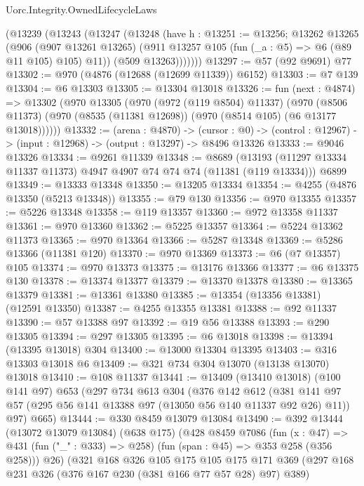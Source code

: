 \begin{lexlean}{Uorc.Integrity.OwnedLifecycleLaws}
\begin{coremodule}
      (@13239
        (@13243
          (@13247
            (@13248
              (have h : @13251 := @13256;
              @13262
                @13265
                (@906
                  (@907 @13261 @13265)
                  (@911 @13257 @105 (fun (_a : @5) => @6 (@89 @11 @105) @105) @11))
                (@509 @13263)))))))
@13297 := @57 (@92 @9691) @77
@13302 := @970 (@4876 (@12688 (@12699 @11339)) @6152)
@13303 := @7 @139
@13304 := @6 @13303
@13305 := @13304 @13018
@13326 := fun (next : @4874) =>
  @13302
    (@970
      @13305
      (@970
        (@972 (@119 @8504) @11337)
        (@970
          (@8506 @11373)
          (@970 (@8535 (@11381 @12698)) (@970 (@8514 @105) (@6 @13177 @13018))))))
@13332 := (arena : @4870) ->
  (cursor : @0) -> (control : @12967) -> (input : @12968) -> (output : @13297) -> @8496 @13326
@13333 := @9046 @13326
@13334 := @9261 @11339
@13348 := @8689
    (@13193 (@11297 @13334 @11337 @11373) @4947 @4907 @74 @74 @74 (@11381 (@119 @13334)))
    @6899
@13349 := @13333 @13348
@13350 := @13205 @13334
@13354 := @4255 (@4876 @13350 (@5213 @13348))
@13355 := @79 @130
@13356 := @970 @13355
@13357 := @5226 @13348
@13358 := @119 @13357
@13360 := @972 @13358 @11337
@13361 := @970 @13360
@13362 := @5225 @13357
@13364 := @5224 @13362 @11373
@13365 := @970 @13364
@13366 := @5287 @13348
@13369 := @5286 @13366 (@11381 @120)
@13370 := @970 @13369
@13373 := @6 (@7 @13357) @105
@13374 := @970 @13373
@13375 := @13176 @13366
@13377 := @6 @13375 @130
@13378 := @13374 @13377
@13379 := @13370 @13378
@13380 := @13365 @13379
@13381 := @13361 @13380
@13385 := @13354 (@13356 @13381) (@12591 @13350)
@13387 := @4255 @13355 @13381
@13388 := @92 @11337
@13390 := @57 @13388 @97
@13392 := @19 @56 @13388
@13393 := @290 @13305
@13394 := @297 @13305
@13395 := @6 @13018
@13398 := @13394 (@13395 @13018) @304
@13400 := @13000 @13304 @13395
@13403 := @316 @13303 @13018 @6
@13409 := @321 @734 @304 @13070 (@13138 @13070) @13018
@13410 := @108 @11337
@13441 := @13409
    (@13410 @13018)
    (@100 @141 @97)
    @653
    (@297
      @734
      @613
      @304
      (@376
        @142
        @612
        (@381 @141 @97 @57 (@295 @56 @141 @13388 @97 (@13050 @56 @140 @11337 @92 @26) @11))
        @97)
      @665)
@13444 := @330 @8459 @13079 @13084
@13490 := @392
    @13444
    (@13072 @13079 @13084)
    (@638 @175)
    (@428
      @8459
      @7086
      (fun (x : @47) => @431 (fun ("_" : @333) => @258) (fun (span : @45) => @353 @258 (@356 @258)))
      @26)
    (@321
      @168
      @326
      @105
      @175
      @105
      @175
      @171
      @369
      (@297 @168 @231 @326 (@376 @167 @230 (@381 @166 @77 @57 @28) @97) @389)

\end{coremodule}
\end{lexlean}

